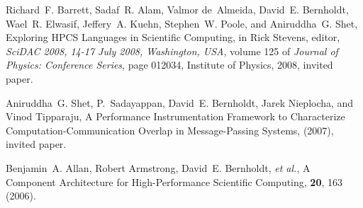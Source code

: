 \begin{thebiobibliography}{99}
Richard~F. Barrett, Sadaf~R. Alam, Valmor de~Almeida, David~E. Bernholdt,
  Wael~R. Elwasif, Jeffery~A. Kuehn, Stephen~W. Poole, and Aniruddha~G. Shet,
\newblock Exploring {HPCS} Languages in Scientific Computing,
\newblock in Rick Stevens, editor, {\em SciDAC 2008, 14-17 July 2008,
  Washington, USA}, volume 125 of {\em Journal of Physics: Conference Series},
  page 012034, Institute of Physics, 2008,
\newblock invited paper.

Aniruddha~G. Shet, P.~Sadayappan, David~E. Bernholdt, Jarek Nieplocha, and
  Vinod Tipparaju,
\newblock A Performance Instrumentation Framework to Characterize
  Computation-Communication Overlap in Message-Passing Systems,
  (2007),
\newblock invited paper.



Benjamin~A. Allan, Robert Armstrong, David~E. Bernholdt, \emph{et al.},
\newblock A Component Architecture for High-Performance Scientific Computing,
 {\bf 20}, 163 (2006).



\end{thebiobibliography}
